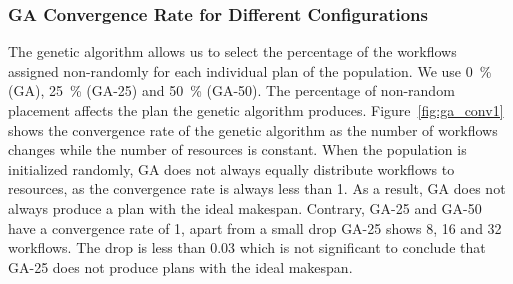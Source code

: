 \subsubsection*{GA Convergence Rate for Different Configurations}
The genetic algorithm allows us to select the percentage of the workflows
assigned non-randomly for each individual plan of the population. We use 0~\%
(GA), 25~\% (GA-25) and 50~\% (GA-50). The percentage of non-random placement
affects the plan the genetic algorithm produces. Figure~\ref{fig:ga_conv1}
shows the convergence rate of the genetic algorithm as the number of workflows
changes while the number of resources is constant. When the population is
initialized randomly, GA does not always equally distribute workflows to
resources, as the convergence rate is always less than 1. As a result, GA does
not always produce a plan with the ideal makespan. Contrary, GA-25 and GA-50
have a convergence rate of 1, apart from a small drop GA-25 shows 8, 16 and 32
workflows. The drop is less than 0.03 which is not significant to conclude
that GA-25 does not produce plans with the ideal makespan.

